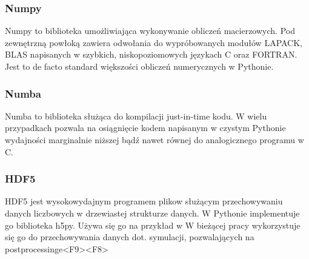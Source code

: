 \subsubsection{Numpy}
Numpy to biblioteka umożliwiająca wykonywanie obliczeń macierzowych. Pod zewnętrzną powłoką zawiera odwołania do
wypróbowanych modułów LAPACK, BLAS %
napisanych w szybkich, niskopoziomowych językach C oraz FORTRAN. Jest to de facto standard większości obliczeń
numerycznych w Pythonie.
\subsubsection{Numba}
Numba to biblioteka służąca do kompilacji just-in-time kodu. %
W wielu przypadkach %
pozwala na osiągnięcie kodem napisanym w czystym Pythonie wydajności marginalnie niższej bądź nawet równej do analogicznego
programu w C. %
\subsubsection{HDF5}
HDF5 jest wysokowydajnym programem plikow służącym przechowywaniu danych liczbowych w drzewiastej strukturze danych.
W Pythonie implementuje go biblioteka h5py.
Używa się go na przykład w %
W bieżącej pracy  wykorzystuje się go do przechowywania danych dot. symulacji, pozwalających na postprocessinge<F9><F8>
